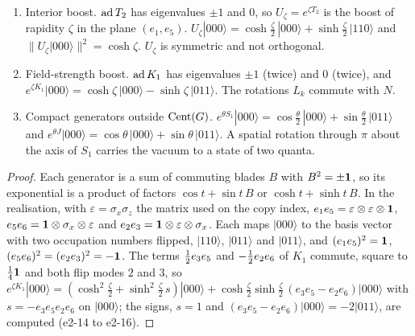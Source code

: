 \begin{proposition}
\label{e2:prop:bogo}
\begin{enumerate}[label=(\roman*),leftmargin=2.2em]
\item Interior boost. $\operatorname{ad} T_2$ has eigenvalues $\pm1$ and $0$, so $U_\zeta=e^{\zeta T_2}$ is the boost of rapidity $\zeta$ in the plane
$(e_1,e_5)$. $U_\zeta|000\rangle=\cosh\tfrac\zeta2\,|000\rangle+\sinh\tfrac\zeta2\,|110\rangle$ and $\|U_\zeta|000\rangle\|^2=\cosh\zeta$. $U_\zeta$ is symmetric and not
orthogonal.
\item Field-strength boost. $\operatorname{ad} K_1$ has eigenvalues $\pm1$ (twice) and $0$ (twice), and
$e^{\zeta K_1}|000\rangle=\cosh\zeta\,|000\rangle-\sinh\zeta\,|011\rangle$. The rotations $L_k$ commute with $N$.
\item Compact generators outside $\operatorname{Cent}(G)$. $e^{\theta S_1}|000\rangle=\cos\tfrac\theta2\,|000\rangle+\sin\tfrac\theta2\,|011\rangle$ and
$e^{\theta J}|000\rangle=\cos\theta\,|000\rangle+\sin\theta\,|011\rangle$. A spatial rotation through $\pi$ about the axis of $S_1$ carries the vacuum to a state
of two quanta.
\end{enumerate}
\end{proposition}

\begin{proof}
Each generator is a sum of commuting blades $B$ with $B^2=\pm\mathbf 1$, so its exponential is a product of factors $\cos t+\sin t\,B$ or
$\cosh t+\sinh t\,B$. In the realisation, with $\varepsilon=\sigma_x\sigma_z$ the matrix used on the copy index,
$e_1e_5=\varepsilon\otimes\varepsilon\otimes\mathbf 1$, $e_5e_6=\mathbf 1\otimes\sigma_x\otimes\varepsilon$ and $e_2e_3=\mathbf 1\otimes\varepsilon\otimes\sigma_x$. Each maps
$|000\rangle$ to the basis vector with two occupation numbers flipped, $|110\rangle$, $|011\rangle$ and $|011\rangle$, and $(e_1e_5)^2=\mathbf 1$,
$(e_5e_6)^2=(e_2e_3)^2=-\mathbf 1$. The terms $\tfrac12 e_3e_5$ and $-\tfrac12 e_2e_6$ of $K_1$ commute, square to $\tfrac14\mathbf 1$ and both flip modes $2$ and $3$, so
$e^{\zeta K_1}|000\rangle=(\cosh^2\tfrac\zeta2+\sinh^2\tfrac\zeta2\,s)|000\rangle+\cosh\tfrac\zeta2\sinh\tfrac\zeta2\,(e_3e_5-e_2e_6)|000\rangle$ with $s=-e_3e_5e_2e_6$ on
$|000\rangle$; the signs, $s=1$ and $(e_3e_5-e_2e_6)|000\rangle=-2|011\rangle$, are computed (e2-14 to e2-16).
\end{proof}

